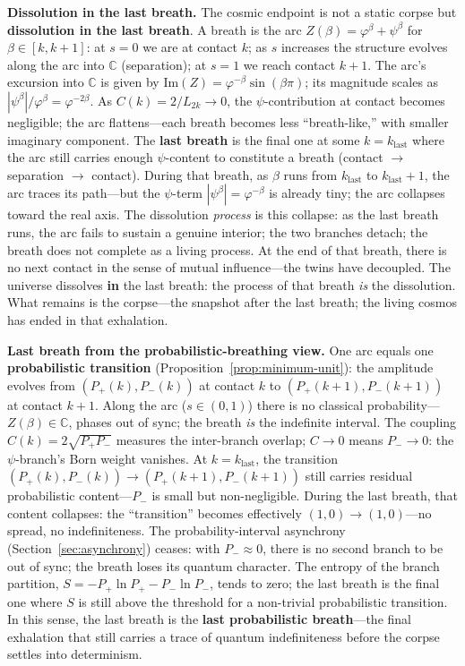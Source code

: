 \documentclass[12pt,a4paper]{article}
\begin{document}
\medskip
\noindent\textbf{Dissolution in the last breath.} The cosmic endpoint is not a static corpse but \textbf{dissolution in the last breath}. A breath is the arc $Z(\beta) = \varphi^\beta + \psi^\beta$ for $\beta \in [k, k+1]$: at $s=0$ we are at contact $k$; as $s$ increases the structure evolves along the arc into $\mathbb{C}$ (separation); at $s=1$ we reach contact $k+1$. The arc's excursion into $\mathbb{C}$ is given by $\mathrm{Im}(Z) = \varphi^{-\beta}\sin(\beta\pi)$; its magnitude scales as $|\psi^\beta|/\varphi^\beta = \varphi^{-2\beta}$. As $C(k) = 2/L_{2k} \to 0$, the $\psi$-contribution at contact becomes negligible; the arc flattens---each breath becomes less ``breath-like,'' with smaller imaginary component. The \textbf{last breath} is the final one at some $k = k_{\mathrm{last}}$ where the arc still carries enough $\psi$-content to constitute a breath (contact $\to$ separation $\to$ contact). During that breath, as $\beta$ runs from $k_{\mathrm{last}}$ to $k_{\mathrm{last}}+1$, the arc traces its path---but the $\psi$-term $|\psi^\beta| = \varphi^{-\beta}$ is already tiny; the arc collapses toward the real axis. The dissolution \emph{process} is this collapse: as the last breath runs, the arc fails to sustain a genuine interior; the two branches detach; the breath does not complete as a living process. At the end of that breath, there is no next contact in the sense of mutual influence---the twins have decoupled. The universe dissolves \textbf{in} the last breath: the process of that breath \emph{is} the dissolution. What remains is the corpse---the snapshot after the last breath; the living cosmos has ended in that exhalation.

\medskip
\noindent\textbf{Last breath from the probabilistic-breathing view.} One arc equals one \textbf{probabilistic transition} (Proposition~\ref{prop:minimum-unit}): the amplitude evolves from $(P_+(k), P_-(k))$ at contact $k$ to $(P_+(k+1), P_-(k+1))$ at contact $k+1$. Along the arc ($s \in (0,1)$) there is no classical probability---$Z(\beta) \in \mathbb{C}$, phases out of sync; the breath \emph{is} the indefinite interval. The coupling $C(k) = 2\sqrt{P_+ P_-}$ measures the inter-branch overlap; $C \to 0$ means $P_- \to 0$: the $\psi$-branch's Born weight vanishes. At $k = k_{\mathrm{last}}$, the transition $(P_+(k), P_-(k)) \to (P_+(k+1), P_-(k+1))$ still carries residual probabilistic content---$P_-$ is small but non-negligible. During the last breath, that content collapses: the ``transition'' becomes effectively $(1, 0) \to (1, 0)$---no spread, no indefiniteness. The probability-interval asynchrony (Section~\ref{sec:asynchrony}) ceases: with $P_- \approx 0$, there is no second branch to be out of sync; the breath loses its quantum character. The entropy of the branch partition, $S = -P_+ \ln P_+ - P_- \ln P_-$, tends to zero; the last breath is the final one where $S$ is still above the threshold for a non-trivial probabilistic transition. In this sense, the last breath is the \textbf{last probabilistic breath}---the final exhalation that still carries a trace of quantum indefiniteness before the corpse settles into determinism.
\end{document}
